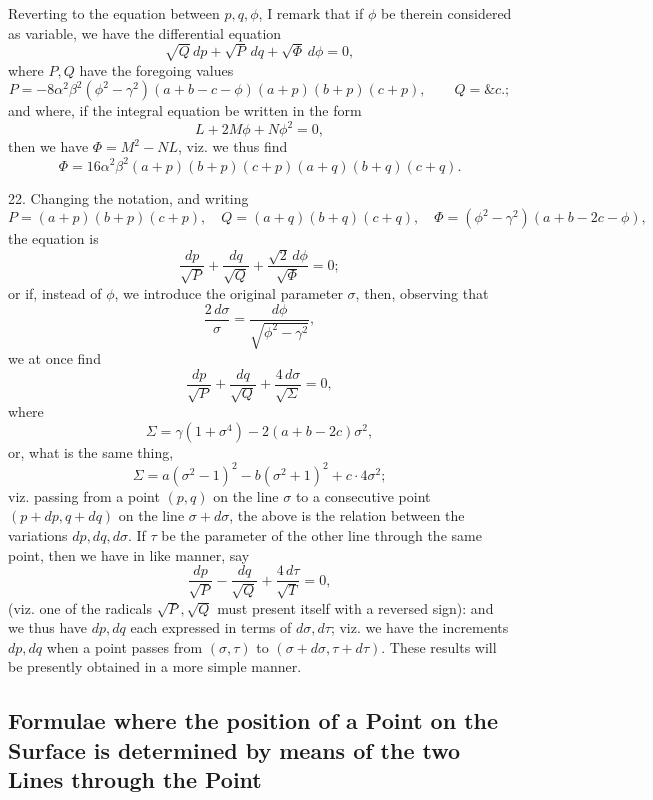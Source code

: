 \documentclass[11pt,a4paper]{article}
\begin{document}
Reverting to the equation between $p,q,\phi$, I remark that if $\phi$ be therein considered
as variable, we have the differential equation
\[
 \sqrt Q\,dp+\sqrt P\,dq+\sqrt\Phi\,d\phi=0,
\]
where $P,Q$ have the foregoing values
\[
 P=-8\alpha^2\beta^2(\phi^2-\gamma^2)(a+b-c-\phi)(a+p)(b+p)(c+p),\qquad Q=\&c.;
\]
and where, if the integral equation be written in the form
\[
 L+2M\phi+N\phi^2=0,
\]
then we have $\Phi=M^2-NL$, viz. we thus find
\[
 \Phi=16\alpha^2\beta^2(a+p)(b+p)(c+p)(a+q)(b+q)(c+q).
\]

22. Changing the notation, and writing
\[
 P=(a+p)(b+p)(c+p),\quad Q=(a+q)(b+q)(c+q),\quad
 \Phi=(\phi^2-\gamma^2)(a+b-2c-\phi),
\]
the equation is
\[
 \frac{dp}{\sqrt P}+\frac{dq}{\sqrt Q}
 +\frac{\sqrt2\,d\phi}{\sqrt\Phi}=0;
\]
or if, instead of $\phi$, we introduce the original parameter $\sigma$, then, observing that
\[
 \frac{2\,d\sigma}{\sigma}=\frac{d\phi}{\sqrt{\phi^2-\gamma^2}},
\]
we at once find
\[
 \frac{dp}{\sqrt P}+\frac{dq}{\sqrt Q}+\frac{4\,d\sigma}{\sqrt\Sigma}=0,
\]
where
\[
 \Sigma=\gamma(1+\sigma^4)-2(a+b-2c)\sigma^2,
\]
or, what is the same thing,
\[
 \Sigma=a(\sigma^2-1)^2-b(\sigma^2+1)^2+c\cdot 4\sigma^2;
\]
viz. passing from a point $(p,q)$ on the line $\sigma$ to a consecutive point
$(p+dp,q+dq)$ on the line $\sigma+d\sigma$, the above is the relation between the variations
$dp,dq,d\sigma$. If $\tau$ be the parameter of the other line through the same point, then we
have in like manner, say
\[
 \frac{dp}{\sqrt P}-\frac{dq}{\sqrt Q}+\frac{4\,d\tau}{\sqrt T}=0,
\]
(viz. one of the radicals $\sqrt P,\sqrt Q$ must present itself with a reversed sign):
and we thus have $dp,dq$ each expressed in terms of $d\sigma,d\tau$; viz. we have the increments
$dp,dq$ when a point passes from $(\sigma,\tau)$ to $(\sigma+d\sigma,\tau+d\tau)$.
These results will be presently obtained in a more simple manner.

\subsection*{Formulae where the position of a Point on the Surface is determined by means of the two Lines through the Point}
\end{document}
